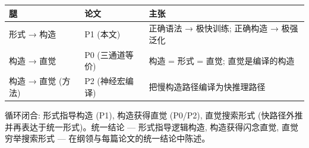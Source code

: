 \documentclass[
]{article}
\begin{document}
\begin{longtable}[]{@{}lll@{}}
\toprule\noalign{}
腿 & 论文 & 主张 \\
\midrule\noalign{}
\endhead
\bottomrule\noalign{}
\endlastfoot
形式 → 构造 & P1 (本文) & 正确语法 → 极快训练; 正确构造 → 极强泛化 \\
构造 → 直觉 & P0 (三通道等价) & 构造 = 形式 = 直觉; 直觉是编译的构造 \\
构造 → 直觉 (方法) & P2 (神经宏编译) & 把慢构造路径编译为快推理路径 \\
\end{longtable}

循环闭合: 形式指导构造 (P1), 构造获得直觉 (P0/P2), 直觉搜索形式
(快路径外推并再表达于统一形式)。统一结论 --- 形式指导逻辑构造,
构造获得闪念直觉, 直觉穷举搜索形式 ---
在纲领与每篇论文的统一结论中陈述。
\end{document}
